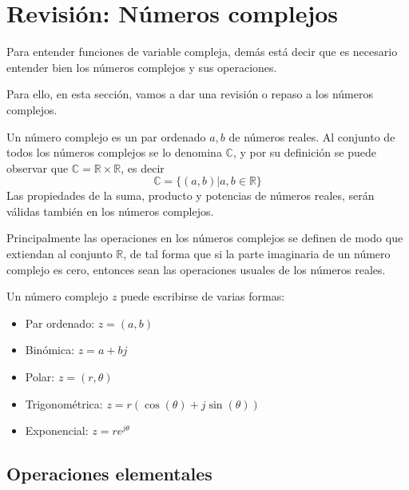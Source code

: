 \section[Números complejos]{Revisión: Números complejos}

Para entender funciones de variable compleja, demás está decir que es necesario entender bien los números complejos y sus operaciones. 

Para ello, en esta sección, vamos a dar una revisión o repaso a los números complejos.

\begin{definition}
  Un número complejo es un par ordenado \(a,b\) de números reales. Al conjunto de todos los números complejos se lo denomina $\mathbb{C}$, y por su definición se puede observar que $\mathbb{C}=\mathbb{R}\times\mathbb{R}$, es decir 
  $$
  \mathbb{C}=\{(a,b)|a,b \in \mathbb{R}\}
  $$
  Las propiedades de la suma, producto y potencias de números reales, serán válidas también en los números complejos.
\end{definition}

Principalmente las operaciones en los números complejos se definen de modo que extiendan al conjunto $\mathbb{R}$, de tal forma que si la parte imaginaria de un número complejo es cero, entonces sean las operaciones usuales de los números reales.

Un número complejo $z$ puede escribirse de varias formas:
\begin{itemize}
  \item Par ordenado: $z=(a,b)$
  \item Binómica: $z=a+bj$
  \item Polar: $z=(r,\theta)$
  \item Trigonométrica: $z=r(\cos(\theta)+j\sin(\theta))$
  \item Exponencial: $z=re^{j\theta}$
\end{itemize}

\subsection{Operaciones elementales}

